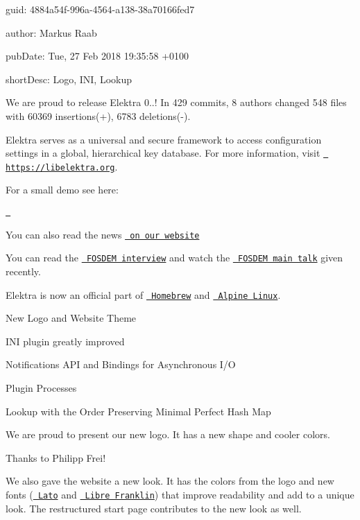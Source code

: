 
\begin{DoxyItemize}
\item guid\+: 4884a54f-\/996a-\/4564-\/a138-\/38a70166fed7
\item author\+: Markus Raab
\item pub\+Date\+: Tue, 27 Feb 2018 19\+:35\+:58 +0100
\item short\+Desc\+: Logo, I\+NI, Lookup
\end{DoxyItemize}

We are proud to release Elektra 0..! In 429 commits, 8 authors changed 548 files with 60369 insertions(+), 6783 deletions(-\/).

Elektra serves as a universal and secure framework to access configuration settings in a global, hierarchical key database. For more information, visit \href{https://libelektra.org}{\texttt{ https\+://libelektra.\+org}}.

For a small demo see here\+:

\href{https://asciinema.org/a/cantr04assr4jkv8v34uz9b8r}{\texttt{ }}

You can also read the news \href{https://www.libelektra.org/news/0.8.22-release}{\texttt{ on our website}}

You can read the \href{https://fosdem.org/2018/interviews/markus-raab/}{\texttt{ F\+O\+S\+D\+EM interview}} and watch the \href{https://fosdem.org/2018/schedule/event/elektra/}{\texttt{ F\+O\+S\+D\+EM main talk}} given recently.

Elektra is now an official part of \href{http://formulae.brew.sh/formula/elektra}{\texttt{ Homebrew}} and \href{https://pkgs.alpinelinux.org/package/edge/testing/x86_64/elektra}{\texttt{ Alpine Linux}}.


\begin{DoxyItemize}
\item New Logo and Website Theme
\item I\+NI plugin greatly improved
\item Notifications A\+PI and Bindings for Asynchronous I/O
\item Plugin Processes
\item Lookup with the Order Preserving Minimal Perfect Hash Map
\end{DoxyItemize}

We are proud to present our new logo. It has a new shape and cooler colors.



Thanks to Philipp Frei!

We also gave the website a new look. It has the colors from the logo and new fonts (\href{https://fonts.google.com/specimen/Lato}{\texttt{ Lato}} and \href{https://fonts.google.com/specimen/Libre+Franklin}{\texttt{ Libre Franklin}}) that improve readability and add to a unique look. The restructured start page contributes to the new look as well.

